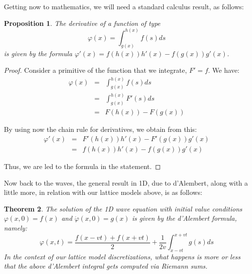 \documentclass[12pt]{amsbook}
\newtheorem{theorem}{Theorem}[chapter]
\newtheorem{proposition}[theorem]{Proposition}
\begin{document}
Getting now to mathematics, we will need a standard calculus result, as follows:

\begin{proposition}
The derivative of a function of type
$$\varphi(x)=\int_{g(x)}^{h(x)}f(s)ds$$
is given by the formula $\varphi'(x)=f(h(x))h'(x)-f(g(x))g'(x)$.
\end{proposition}

\begin{proof}
Consider a primitive of the function that we integrate, $F'=f$. We have:
\begin{eqnarray*}
\varphi(x)
&=&\int_{g(x)}^{h(x)}f(s)ds\\
&=&\int_{g(x)}^{h(x)}F'(s)ds\\
&=&F(h(x))-F(g(x))
\end{eqnarray*}

By using now the chain rule for derivatives, we obtain from this:
\begin{eqnarray*}
\varphi'(x)
&=&F'(h(x))h'(x)-F'(g(x))g'(x)\\
&=&f(h(x))h'(x)-f(g(x))g'(x)
\end{eqnarray*}

Thus, we are led to the formula in the statement.
\end{proof}

Now back to the waves, the general result in 1D, due to d'Alembert, along with a little more, in relation with our lattice models above, is as follows:

\begin{theorem}
The solution of the 1D wave equation with initial value conditions $\varphi(x,0)=f(x)$ and $\dot{\varphi}(x,0)=g(x)$ is given by the d'Alembert formula, namely:
$$\varphi(x,t)=\frac{f(x-vt)+f(x+vt)}{2}+\frac{1}{2v}\int_{x-vt}^{x+vt}g(s)ds$$
In the context of our lattice model discretizations, what happens is more or less that the above d'Alembert integral gets computed via Riemann sums.
\end{theorem}
\end{document}
